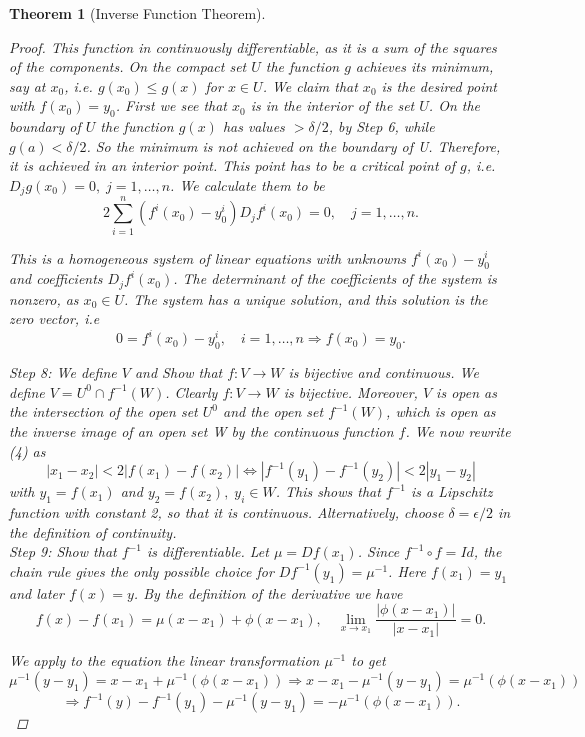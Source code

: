 \documentclass[12pt]{article}
\newtheorem{theorem}{Theorem}[section]
\begin{document}
\begin{theorem}[Inverse Function Theorem]
\begin{proof}
This function in continuously differentiable, as it is a sum of the squares of the components.
On the compact set $U$ the function $g$ achieves its minimum, say at $x_0$, i.e. $g(x_0) \leq g(x)$ for
$x \in U$. We claim that $x_0$ is the desired point with $f(x_0) = y_0$. First we see that $x_0$ is in the
interior of the set $U$. On the boundary of $U$ the function $g(x)$ has values $> \delta /2$, by Step 6,
while $g(a) < \delta /2$. So the minimum is not achieved on the boundary of U. Therefore, it is
achieved in an interior point. This point has to be a critical point of $g$, i.e. $D_j g(x_0) = 0,
\; j = 1, \dots , n$. We calculate them to be
\[ 2 \sum^{n}_{i=1}(f^i (x_0) - y^{i}_{0})D_{j}f^{i}(x_0) = 0, \quad j=1, \dots , n.\]

This is a homogeneous system of linear equations with unknowns $f^{i}(x_0) - y^{i}_{0}$ and coefficients $D_j f^{i}(x_0)$. The determinant of the coefficients of the system is nonzero, as $x_0 \in U$. The system has a unique solution, and this solution is the zero vector, i.e
\[ 0 = f^{i}(x_0) - y^{i}_{0}, \quad i=1, \dots, n \Rightarrow f(x_0) = y_{0}. \]

\textit{Step 8:} We define $V$ and Show that $f:V \rightarrow W$ is bijective and continuous. We define $V = U^0 \cap f^{-1} (W)$. Clearly $f : V \rightarrow W$ is bijective. Moreover, $V$ is open as the intersection of the open set $U^0$
and the open set $f^{-1} (W)$, which is open as the inverse image of an open set W by the continuous function $f$. We now rewrite (4) as
\begin{equation}
|x_1 - x_2 | < 2| f(x_1) - f(x_2)| \Leftrightarrow |f^{-1}(y_1)- f^{-1}(y_2)| < 2|y_1 - y_2 |
\end{equation}
with $y_1 = f(x_1)$ and $y_2 = f(x_2),\; y_i \in W$. This shows that $f^{-1}$ is a Lipschitz function with constant 2, so that it is continuous. Alternatively, choose $\delta = \epsilon /2$ in the definition of continuity.\\

\textit{Step 9:}  Show that $f^{-1}$ is differentiable. Let $\mu = Df(x_1)$. Since $f^{-1} \circ f = Id$, the chain
rule gives the only possible choice for $Df^{-1}(y_1)= \mu^{-1}$. Here $f(x_1) = y_1$ and later $f(x) = y$.
By the definition of the derivative we have
\[ f(x) - f(x_1) = \mu (x-x_1) + \phi(x-x_1), \quad \lim_{x \rightarrow x_1}\frac{|\phi(x - x_1)|}{|x - x_1|} = 0.\]

We apply to the equation the linear transformation $\mu^{-1}$ to get
\[ \mu^{-1}(y-y_1) = x - x_1 + \mu^{-1}(\phi(x - x_1)) \Rightarrow x - x_1 -\mu^{-1}(y-y_1) = \mu^{-1}(\phi(x - x_1)) \]
\[ \Rightarrow f^{-1}(y) - f^{-1}(y_1) - \mu^{-1}(y - y_1) = -\mu^{-1}(\phi(x-x_1)). \]


\end{proof}
\end{theorem}
\end{document}
